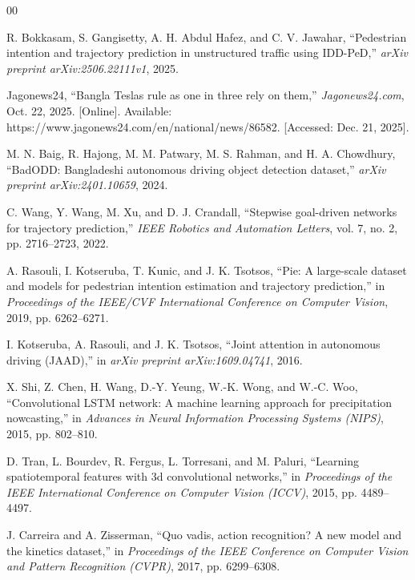 \documentclass[12pt, a4paper]{article}
\begin{document}
\clearpage
{}
\begin{thebibliography}{00}

R. Bokkasam, S. Gangisetty, A. H. Abdul Hafez, and C. V. Jawahar, ``Pedestrian intention and trajectory prediction in unstructured traffic using IDD-PeD,'' \textit{arXiv preprint arXiv:2506.22111v1}, 2025.

Jagonews24, ``Bangla Teslas rule as one in three rely on them,'' \textit{Jagonews24.com}, Oct. 22, 2025. [Online]. Available: https://www.jagonews24.com/en/national/news/86582. [Accessed: Dec. 21, 2025].

M. N. Baig, R. Hajong, M. M. Patwary, M. S. Rahman, and H. A. Chowdhury, ``BadODD: Bangladeshi autonomous driving object detection dataset,'' \textit{arXiv preprint arXiv:2401.10659}, 2024.

C. Wang, Y. Wang, M. Xu, and D. J. Crandall, ``Stepwise goal-driven networks for trajectory prediction,'' \textit{IEEE Robotics and Automation Letters}, vol. 7, no. 2, pp. 2716–2723, 2022.

A. Rasouli, I. Kotseruba, T. Kunic, and J. K. Tsotsos, ``Pie: A large-scale dataset and models for pedestrian intention estimation and trajectory prediction,'' in \textit{Proceedings of the IEEE/CVF International Conference on Computer Vision}, 2019, pp. 6262–6271.

I. Kotseruba, A. Rasouli, and J. K. Tsotsos, ``Joint attention in autonomous driving (JAAD),'' in \textit{arXiv preprint arXiv:1609.04741}, 2016.

X. Shi, Z. Chen, H. Wang, D.-Y. Yeung, W.-K. Wong, and W.-C. Woo, ``Convolutional LSTM network: A machine learning approach for precipitation nowcasting,'' in \textit{Advances in Neural Information Processing Systems (NIPS)}, 2015, pp. 802--810.

D. Tran, L. Bourdev, R. Fergus, L. Torresani, and M. Paluri, ``Learning spatiotemporal features with 3d convolutional networks,'' in \textit{Proceedings of the IEEE International Conference on Computer Vision (ICCV)}, 2015, pp. 4489--4497.

J. Carreira and A. Zisserman, ``Quo vadis, action recognition? A new model and the kinetics dataset,'' in \textit{Proceedings of the IEEE Conference on Computer Vision and Pattern Recognition (CVPR)}, 2017, pp. 6299--6308.


\end{thebibliography}
\end{document}
